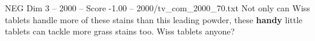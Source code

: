 \begin{textsample}{NEG Dim 3 – 2000 – Score -1.00 – 2000/tv\_com\_2000\_70.txt}  \label{ex:f3_neg_002}
Not only can Wiss tablets handle more of these stains than this leading powder, these \textbf{handy} little tablets can tackle more grass stains too.
Wiss tablets anyone?

\end{textsample}
